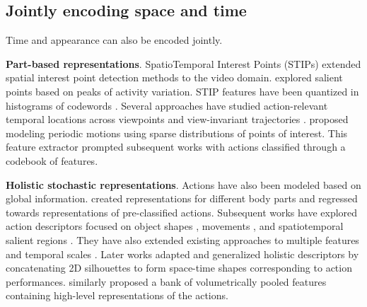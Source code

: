 \subsection{Jointly encoding space and time}
\label{sec:modeling::joint}

 Time and appearance can also be encoded jointly. 

\noindent
\textbf{Part-based representations}. SpatioTemporal Interest Points (STIPs)  extended spatial interest point detection methods  to the video domain.  explored salient points based on peaks of activity variation. STIP features have been quantized in histograms of codewords . Several approaches have studied action-relevant temporal locations across viewpoints  and view-invariant trajectories .  proposed modeling periodic motions using sparse distributions of points of interest. This feature extractor prompted subsequent works  with actions classified through a codebook of features.

\noindent
\textbf{Holistic stochastic representations}. Actions have also been modeled based on global information.  created representations for different body parts and regressed towards representations of pre-classified actions. Subsequent works have explored action descriptors focused on object shapes , movements , and spatiotemporal salient regions . They have also extended existing approaches to multiple features and temporal scales . Later works  adapted and generalized holistic descriptors  by concatenating 2D silhouettes to form space-time shapes corresponding to action performances.  similarly proposed a bank of volumetrically pooled features containing high-level representations of the actions. 

